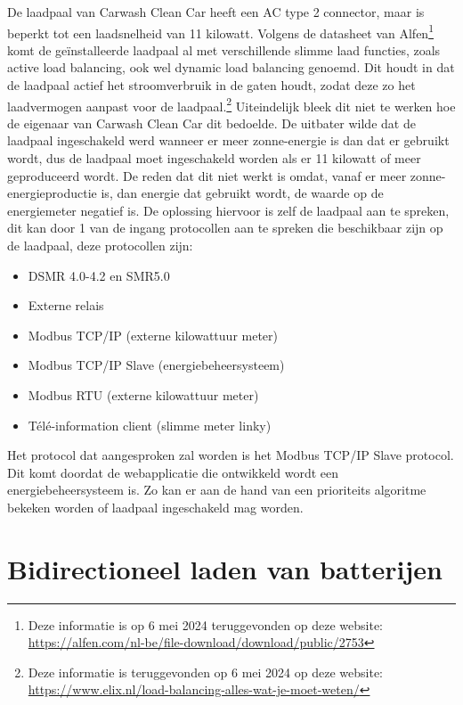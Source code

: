 De laadpaal van Carwash Clean Car heeft een AC type 2 connector, maar is beperkt tot een laadsnelheid van 11 kilowatt. Volgens de datasheet van Alfen\footnote{Deze informatie is op 6 mei 2024 teruggevonden op deze website: \url{https://alfen.com/nl-be/file-download/download/public/2753}} komt de geïnstalleerde laadpaal al met verschillende slimme laad functies, zoals active load balancing, ook wel dynamic load balancing genoemd. Dit houdt in dat de laadpaal actief het stroomverbruik in de gaten houdt, zodat deze zo het laadvermogen aanpast voor de laadpaal.\footnote{Deze informatie is teruggevonden op 6 mei 2024 op deze website: \url{https://www.elix.nl/load-balancing-alles-wat-je-moet-weten/}} Uiteindelijk bleek dit niet te werken hoe de eigenaar van Carwash Clean Car dit bedoelde. De uitbater wilde dat de laadpaal ingeschakeld werd wanneer er meer zonne-energie is dan dat er gebruikt wordt, dus de laadpaal moet ingeschakeld worden als er 11 kilowatt of meer geproduceerd wordt. De reden dat dit niet werkt is omdat, vanaf er meer zonne-energieproductie is, dan energie dat gebruikt wordt, de waarde op de energiemeter negatief is.  De oplossing hiervoor is zelf de laadpaal aan te spreken, dit kan door 1 van de ingang protocollen aan te spreken die beschikbaar zijn op de laadpaal, deze protocollen zijn:

\begin{itemize}
    \item DSMR 4.0-4.2 en SMR5.0
    \item Externe relais
    \item Modbus TCP/IP (externe kilowattuur meter)
    \item Modbus TCP/IP Slave (energiebeheersysteem)
    \item Modbus RTU (externe kilowattuur meter)
    \item Télé-information client (slimme meter linky)
\end{itemize}

Het protocol dat aangesproken zal worden is het Modbus TCP/IP Slave protocol. Dit komt doordat de webapplicatie die ontwikkeld wordt een energiebeheersysteem is. Zo kan er aan de hand van een prioriteits algoritme bekeken worden of laadpaal ingeschakeld mag worden.


\section{Bidirectioneel laden van batterijen}
\label{sec:stand-van-zaken-bidirectioneel-laden}

